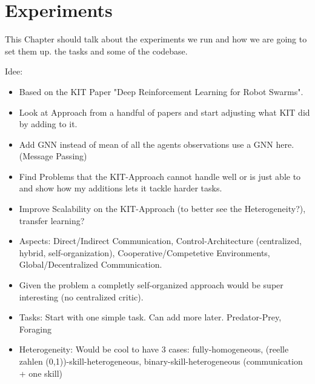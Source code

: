 
\chapter{Experiments}
\label{ch:Experiments}

This Chapter should talk about the experiments we run and how we are going to set them up. the tasks and some of the codebase.

Idee:
\begin{itemize}[noitemsep,nolistsep]
    \item Based on the KIT Paper "Deep Reinforcement Learning for Robot Swarms".
    \item Look at Approach from a handful of papers and start adjusting what KIT did by adding to it.
    \item Add GNN instead of mean of all the agents observations use a GNN here. (Message Passing)
    \item Find Problems that the KIT-Approach cannot handle well or is just able to and show how my additions lets it tackle harder tasks.
    \item Improve Scalability on the KIT-Approach (to better see the Heterogeneity?), transfer learning?
    \item Aspects: Direct/Indirect Communication, Control-Architecture (centralized, hybrid, self-organization), Cooperative/Competetive Environments, Global/Decentralized Communication.
    \item Given the problem a completly self-organized approach would be super interesting (no centralized critic).
    \item Tasks: Start with one simple task. Can add more later. Predator-Prey, Foraging
    \item Heterogeneity: Would be cool to have 3 cases: fully-homogeneous, (reelle zahlen (0,1))-skill-heterogeneous, binary-skill-heterogeneous (communication + one skill)
\end{itemize} 